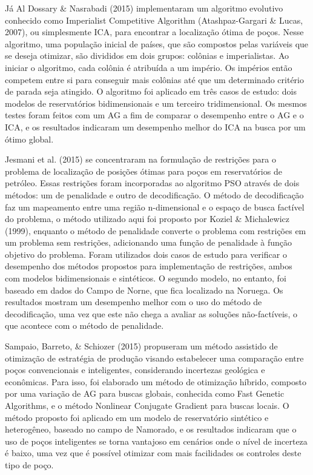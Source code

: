 Já Al Dossary \& Nasrabadi (2015) implementaram um algoritmo evolutivo conhecido como Imperialist Competitive Algorithm (Atashpaz-Gargari \& Lucas, 2007), ou simplesmente ICA, para encontrar a localização ótima de poços. Nesse algoritmo, uma população inicial de países, que são compostos pelas variáveis que se deseja otimizar, são divididos em dois grupos: colônias e imperialistas. Ao iniciar o algoritmo, cada colônia é atribuída a um império. Os impérios então competem entre si para conseguir mais colônias até que um determinado critério de parada seja atingido. O algoritmo foi aplicado em três casos de estudo: dois modelos de reservatórios bidimensionais e um terceiro tridimensional. Os mesmos testes foram feitos com um AG a fim de comparar o desempenho entre o AG e o ICA, e os resultados indicaram um desempenho melhor do ICA na busca por um ótimo global.

Jesmani et al. (2015) se concentraram na formulação de restrições para o problema de localização de posições ótimas para poços em reservatórios de petróleo. Essas restrições foram incorporadas ao algoritmo PSO através de dois métodos: um de penalidade e outro de decodificação. O método de decodificação faz um mapeamento entre uma região n-dimensional e o espaço de busca factível do problema, o método utilizado aqui foi proposto por Koziel \& Michalewicz (1999), enquanto o método de penalidade converte o problema com restrições em um problema sem restrições, adicionando uma função de penalidade à função objetivo do problema. Foram utilizados dois casos de estudo para verificar o desempenho dos métodos propostos para implementação de restrições, ambos com modelos bidimensionais e sintéticos. O segundo modelo, no entanto, foi baseado em dados do Campo de Norne, que fica localizado na Noruega. Os resultados mostram um desempenho melhor com o uso do método de decodificação, uma vez que este não chega a avaliar as soluções não-factíveis, o que acontece com o método de penalidade.

Sampaio, Barreto, \& Schiozer (2015) propuseram um método assistido de otimização de estratégia de produção visando estabelecer uma comparação entre poços convencionais e inteligentes, considerando incertezas geológica e econômicas. Para isso, foi elaborado um método de otimização híbrido, composto por uma variação de AG para buscas globais, conhecida como Fast Genetic Algorithms, e o método Nonlinear Conjugate Gradient para buscas locais. O método proposto foi aplicado em um modelo de reservatório sintético e heterogêneo, baseado no campo de Namorado, e os resultados indicaram que o uso de poços inteligentes se torna vantajoso em cenários onde o nível de incerteza é baixo, uma vez que é possível otimizar com mais facilidades os controles deste tipo de poço.

